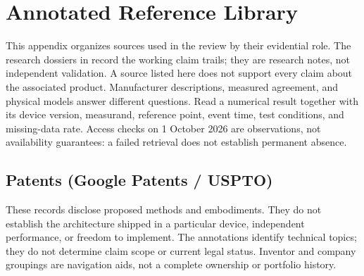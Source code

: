 \chapter{Annotated Reference Library}
\label{app:links}
\begingroup
\raggedright
\def\UrlBreaks{\do\/\do\-\do\.\do\_\do\?\do\=\do\&
  \do\a\do\b\do\c\do\d\do\e\do\f\do\g\do\h\do\i\do\j\do\k\do\l\do\m
  \do\n\do\o\do\p\do\q\do\r\do\s\do\t\do\u\do\v\do\w\do\x\do\y\do\z
  \do\A\do\B\do\C\do\D\do\E\do\F\do\G\do\H\do\I\do\J\do\K\do\L\do\M
  \do\N\do\O\do\P\do\Q\do\R\do\S\do\T\do\U\do\V\do\W\do\X\do\Y\do\Z
  \do\0\do\1\do\2\do\3\do\4\do\5\do\6\do\7\do\8\do\9}

This appendix organizes sources used in the review by their evidential role.
The research dossiers in
 record the working
claim trails; they are research notes, not independent validation. A source
listed here does not support every claim about the associated product.
Manufacturer descriptions, measured agreement, and physical models answer
different questions. Read a numerical result together with its device version,
measurand, reference point, event time, test conditions, and missing-data rate.
Access checks on 1 October 2026 are observations, not availability guarantees:
a failed retrieval does not establish permanent absence.

\section{Patents (Google Patents / USPTO)}

These records disclose proposed methods and embodiments. They do not establish the architecture shipped
in a particular device, independent performance, or freedom to implement.
The annotations identify technical topics; they do not determine claim scope
or current legal status. Inventor and company groupings are navigation aids,
not a complete ownership or portfolio history.

